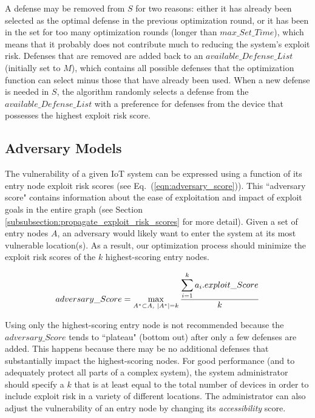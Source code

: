 \documentclass[10pt,journal,compsoc]{IEEEtran}
\begin{document}
A defense may be removed from $S$ for two reasons: either it has already been selected as the optimal defense in the previous optimization round, or it has been in the set for too many optimization rounds (longer than $max\_Set\_Time$), which means that it probably does not contribute much to reducing the system's exploit risk. Defenses that are removed are added back to an $available\_Defense\_List$ (initially set to $M$), which contains all possible defenses that the optimization function can select minus those that have already been used. When a new defense is needed in $S$, the algorithm randomly selects a defense from the $available\_Defense\_List$ with a preference for defenses from the device that possesses the highest exploit risk score.

\subsection{Adversary Models}
\label{subsubsection:adversary_models}

The vulnerability of a given IoT system can be expressed using a function of its entry node exploit risk scores (see Eq.~(\ref{eqn:adversary_score})). This ``adversary score" contains information about the ease of exploitation and impact of exploit goals in the entire graph (see Section \ref{subsubsection:propagate_exploit_risk_scores} for more detail). Given a set of entry nodes $A$, an adversary would likely want to enter the system at its most vulnerable location(s). As a result, our optimization process should  minimize the exploit risk scores of the $k$ highest-scoring entry nodes.

\begin{equation}
\label{eqn:adversary_score}
adversary\_Score = \max\limits_{A^{\ast} \subset A \emph{, }\mid A^{\ast} \mid = k} \frac{\displaystyle\sum\limits_{i=1}^{k}a_i.exploit\_Score}{\large{k}}
\end{equation}

\par Using only the highest-scoring entry node is not recommended because the $adversary\_Score$ tends to ``plateau" (bottom out) after only a few defenses are added. This happens because there may be no additional defenses that substantially impact the highest-scoring nodes. For good performance (and to adequately protect all parts of a complex system), the system administrator should specify a $k$ that is at least equal to the total number of devices in order to include exploit risk in a variety of different locations. The administrator can also adjust the vulnerability of an entry node by changing its \textit{accessibility} score.
\end{document}
